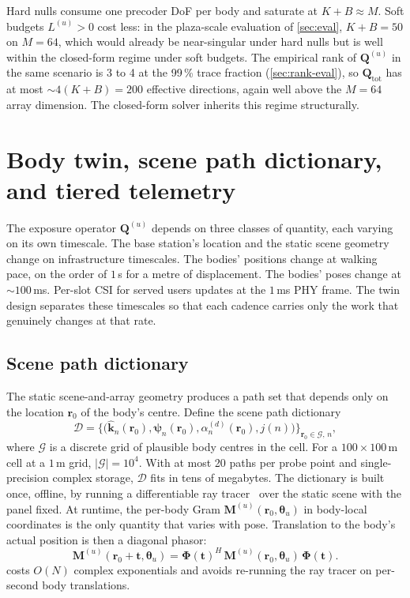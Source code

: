 \documentclass[journal,twocolumn,10pt]{IEEEtran}
\theoremstyle{plain}
\theoremstyle{remark}
\newcommand{\khat}{\hat{\bm{k}}}
\newcommand{\rr}{\mathbf{r}}
\newcommand{\Qmat}{\mathbf{Q}}
\newcommand{\Mmat}{\mathbf{M}}
\newcommand{\Phimat}{\mathbf{\Phi}}
\newcommand{\psin}{\bm{\psi}_n}
\newcommand{\Dict}{\mathcal{D}}
\begin{document}
Hard nulls consume one precoder DoF per body and saturate at
$K + B \approx M$. Soft budgets $L^{(u)} > 0$ cost less: in the
plaza-scale evaluation of \cref{sec:eval}, $K + B = 50$ on $M = 64$,
which would already be near-singular under hard nulls but is well
within the closed-form regime under soft budgets. The empirical rank
of $\Qmat^{(u)}$ in the same scenario is 3 to 4 at the 99\,\% trace
fraction (\cref{sec:rank-eval}), so $\Qmat_{\mathrm{tot}}$ has at
most $\sim 4(K+B) = 200$ effective directions, again well above the
$M = 64$ array dimension. The closed-form solver inherits this
regime structurally.


\section{Body twin, scene path dictionary, and tiered
telemetry}\label{sec:twin}

The exposure operator $\Qmat^{(u)}$ depends on three classes of
quantity, each varying on its own timescale. The base station's
location and the static scene geometry change on infrastructure
timescales. The bodies' positions change at walking pace, on the
order of $1\,$s for a metre of displacement. The bodies' poses change
at $\sim 100\,$ms. Per-slot CSI for served users updates at the
$1\,$ms PHY frame. The twin design separates these timescales so
that each cadence carries only the work that genuinely changes at
that rate.

\subsection{Scene path dictionary}\label{sec:dict}

The static scene-and-array geometry produces a path set that depends
only on the location $\rr_0$ of the body's centre. Define the scene
path dictionary
\begin{equation}\label{eq:dict-def}
  \Dict = \bigl\{\bigl(\khat_n(\rr_0), \psin(\rr_0),
  \alpha_n^{(d)}(\rr_0), j(n)\bigr)\bigr\}_{\rr_0 \in \mathcal{G},\,n},
\end{equation}
where $\mathcal{G}$ is a discrete grid of plausible body centres in
the cell. For a $100 \times 100\,$m cell at a $1\,$m grid,
$|\mathcal{G}| = 10^4$. With at most 20 paths per probe point and
single-precision complex storage, $\Dict$ fits in tens of megabytes.
The dictionary is built once, offline, by running a differentiable ray
tracer~\cite{SionnaRT,DiffeRT} over the static scene with the panel
fixed. At runtime, the per-body Gram $\Mmat^{(u)}(\rr_0, \bm\theta_u)$
in body-local coordinates is the only quantity that varies with
pose. Translation to the body's actual position is then a diagonal
phasor:
\begin{equation}\label{eq:translation}
  \Mmat^{(u)}(\rr_0 + \mathbf{t}, \bm\theta_u) =
  \Phimat(\mathbf{t})^H\,\Mmat^{(u)}(\rr_0, \bm\theta_u)\,\Phimat(\mathbf{t}).
\end{equation}
 costs $O(N)$ complex exponentials and avoids
re-running the ray tracer on per-second body translations.
\end{document}
